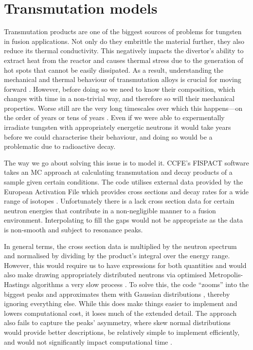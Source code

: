 \documentclass[12pt, a4paper]{article}
\begin{document}
	\section{Transmutation models}\label{s:tm}
		Transmutation products are one of the biggest sources of problems for tungsten in fusion applications. Not only do they embrittle the material further, they also reduce its thermal conductivity. This negatively impacts the divertor's ability to extract heat from the reactor and causes thermal stress due to the generation of hot spots that cannot be easily dissipated. As a result, understanding the mechanical and thermal behaviour of transmutation alloys is crucial for moving forward \cite{transmute, nirrhard, colcas, nirrprop, nirpropmic, nirrmic,ionirrmic, ionirrprop, ionirrprop2, hardening}. However, before doing so we need to know their composition, which changes with time in a non-trivial way, and therefore so will their mechanical properties. Worse still are the very long timescales over which this happens---on the order of years or tens of years \cite{transmute2}. Even if we were able to expermentally irradiate tungsten with appropriately energetic neutrons it would take years before we could characterise their behaviour, and doing so would be a problematic due to radioactive decay.
		
		The way we go about solving this issue is to model it. CCFE's FISPACT \cite{fispact} software takes an MC approach at calculating transmutation and decay products of a sample given certain conditions. The code utilises external data provided by the European Activation File which provides cross sections and decay rates for a wide range of isotopes \cite{library}. Unfortunately there is a lack cross section data for certain neutron energies that contribute in a non-negligible manner to a fusion environment. Interpolating to fill the gaps would not be appropriate as the data is non-smooth and subject to resonance peaks.
		
		In general terms, the cross section data is multiplied by the neutron spectrum and normalised by dividing by the product's integral over the energy range. However, this would require us to have expressions for both quantities and would also make drawing appropriately distributed neutrons via optimised Metropolis-Hastings algorithms a very slow process \cite{methast}. To solve this, the code ``zooms'' into the biggest peaks and approximates them with Gaussian distributions \cite{transmute2}, thereby ignoring everything else. While this does make things easier to implement and lowers computational cost, it loses much of the extended detail. The approach also fails to capture the peaks' asymmetry, where skew normal distributions would provide better descriptions, be relatively simple to implement efficiently, and would not significantly impact computational time \cite{skewnorm1, skewnorm2}.
		
\end{document}
